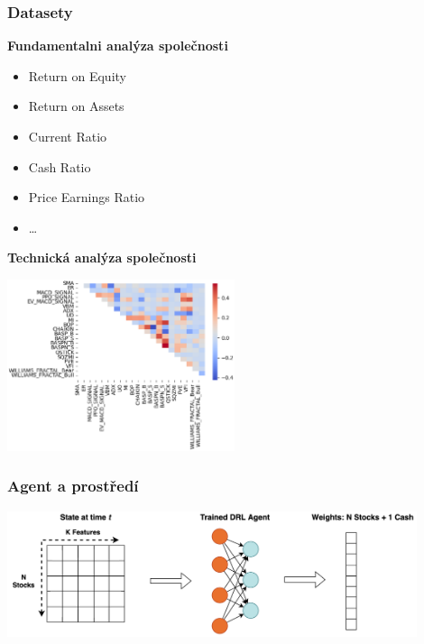 \begin{frame}
    \frametitle{Datasety}
    \begin{multicols}{2}
        \textbf{Fundamentalni analýza společnosti}
        \begin{itemize}
            \item Return on Equity
            \item Return on Assets
            \item Current Ratio
            \item Cash Ratio
            \item Price Earnings Ratio
            \item \ldots
        \end{itemize}
        \columnbreak
        \textbf{Technická analýza společnosti}
        \begin{center}
            \centering
            \includegraphics[width=0.5\textwidth]{img/corr}
        \end{center}
    \end{multicols}
\end{frame}

\begin{frame}
    \frametitle{Agent a prostředí}

    \begin{center}
        \centering
        \includegraphics[width=0.9\textwidth]{img/env}
    \end{center}
\end{frame}

